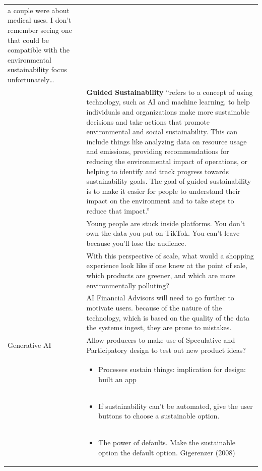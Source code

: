 \documentclass[
  letterpaper,
  DIV=11,
  numbers=noendperiod]{scrartcl}
\providecommand{\tightlist}{%
  \setlength{\itemsep}{0pt}\setlength{\parskip}{0pt}}\usepackage{longtable,booktabs,array}
\begin{document}
\begin{longtable}[]{@{}
  >{\raggedright\arraybackslash}p{}
  >{\raggedright\arraybackslash}p{}@{}}
a couple were about medical uses. I don't remember seeing one that could
be compatible with the environmental sustainability focus
unfortunately\ldots{} \\
& \textbf{Guided Sustainability} ``refers to a concept of using
technology, such as AI and machine learning, to help individuals and
organizations make more sustainable decisions and take actions that
promote environmental and social sustainability. This can include things
like analyzing data on resource usage and emissions, providing
recommendations for reducing the environmental impact of operations, or
helping to identify and track progress towards sustainability goals. The
goal of guided sustainability is to make it easier for people to
understand their impact on the environment and to take steps to reduce
that impact.'' \\
& Young people are stuck inside platforms. You don't own the data you
put on TikTok. You can't leave because you'll lose the audience. \\
& With this perspective of scale, what would a shopping experience look
like if one knew at the point of sale, which products are greener, and
which are more environmentally polluting? \\
& AI Financial Advisors will need to go further to motivate users.
because of the nature of the technology, which is based on the quality
of the data the systems ingest, they are prone to mistakes. \\
Generative AI & Allow producers to make use of Speculative and
Participatory design to test out new product ideas? \\
& \begin{minipage}[t]{\linewidth}\raggedright
\begin{itemize}
\tightlist
\item
  Processes sustain things: implication for design: built an app
\end{itemize}
\end{minipage} \\
& \begin{minipage}[t]{\linewidth}\raggedright
\begin{itemize}
\tightlist
\item
  If sustainability can't be automated, give the user buttons to choose
  a sustainable option.
\end{itemize}
\end{minipage} \\
& \begin{minipage}[t]{\linewidth}\raggedright
\begin{itemize}
\tightlist
\item
  The power of defaults. Make the sustainable option the default option.
  Gigerenzer (2008)
\end{itemize}
\end{minipage} \\
\end{longtable}
\end{document}
